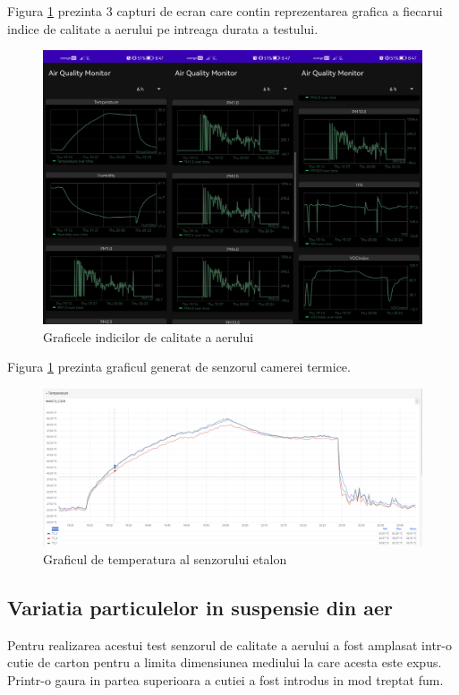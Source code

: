 Figura \ref{fig:tv_temp_var_chart_view} prezinta 3 capturi de ecran care contin reprezentarea grafica a fiecarui indice de calitate a aerului pe 
intreaga durata a testului.
\begin{figure}[H]
    \centering
    \includegraphics[scale=0.18]{figs/tv_temp_var_chart_view.png}
    \caption{Graficele indicilor de calitate a aerului}
    \label{fig:tv_temp_var_chart_view}
\end{figure}

Figura \ref{fig:tv_temp_var_chart_view} prezinta graficul generat de senzorul camerei termice.
\begin{figure}[H]
    \centering
    \includegraphics[scale=0.3]{figs/tv_temp_var_waist_chart.png}
    \caption{Graficul de temperatura al senzorului etalon}
    \label{fig:tv_temp_var_waist_chart}
\end{figure}

\subsection{Variatia particulelor in suspensie din aer}
Pentru realizarea acestui test senzorul de calitate a aerului a fost amplasat intr-o cutie de carton pentru a limita dimensiunea mediului la care acesta este expus. 
Printr-o gaura in partea superioara a cutiei a fost introdus in mod treptat fum.

